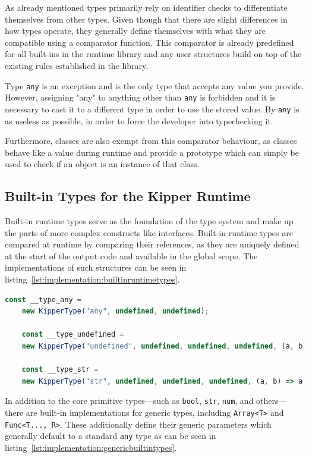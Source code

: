 As already mentioned types primarily rely on identifier checks to differentiate themselves from other types. Given though that there are slight differences in how types operate, they generally define themselves with what they are compatible using a comparator function. This comparator is already predefined for all built-ins in the runtime library and any user structures build on top of the existing rules established in the library.

Type \lstinline|any| is an exception and is the only type that accepts any value you provide. However, assigning "any" to anything other than \lstinline|any| is forbidden and it is necessary to cast it to a different type in order to use the stored value. By  \lstinline|any| is as useless as possible, in order to force the developer into typechecking it.

Furthermore, classes are also exempt from this comparator behaviour, as classes behave like a value during runtime and provide a prototype which can simply be used to check if an object is an instance of that class.

\subsection{Built-in Types for the Kipper Runtime}
\label{subsec:builtintypes}

Built-in runtime types serve as the foundation of the type system and make up the parts of more complex constructs like interfaces. Built-in runtime types are compared at runtime by comparing their references, as they are uniquely defined at the start of the output code and available in the global scope. The implementations of such structures can be seen in listing~\ref{lst:implementation:builtinruntimetypes}.

\begin{lstlisting}[language=TypeScript,caption=Examples for the built-in runtime types,label=lst:implementation:builtinruntimetypes]
	const __type_any =
	new KipperType("any", undefined, undefined);

	const __type_undefined =
	new KipperType("undefined", undefined, undefined, undefined, (a, b) => a.name === b.name);

	const __type_str =
	new KipperType("str", undefined, undefined, undefined, (a, b) => a.name === b.name);
\end{lstlisting}

In addition to the core primitive types—such as \lstinline|bool|, \lstinline|str|, \lstinline|num|, and others—there are built-in implementations for generic types, including \lstinline|Array<T>| and  \lstinline|Func<T..., R>|. These additionally define their generic parameters which generally default to a standard \lstinline|any| type as can be seen in listing~\ref{lst:implementation:genericbuiltintypes}.


